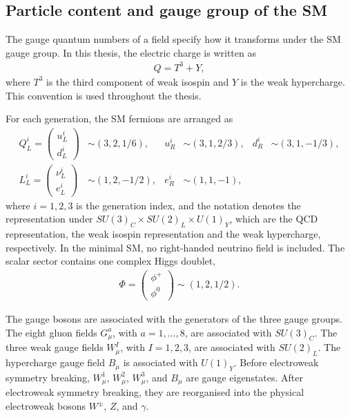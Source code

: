 \subsection{Particle content and gauge group of the SM}
\label{subsec:sm_particle_content}

The gauge quantum numbers of a field specify how it transforms under the SM gauge group. 
In this thesis, the electric charge is written as
\begin{align}
    Q = T^{3} + Y,
    \label{eq:electric_charge_relation}
\end{align}
where $T^{3}$ is the third component of weak isospin and $Y$ is the weak hypercharge. 
This convention is used throughout the thesis.

For each generation, the SM fermions are arranged as
\begin{align}
    Q_{L}^{i}
    =
    \begin{pmatrix}
        u_{L}^{i} \\
        d_{L}^{i}
    \end{pmatrix}
    &\sim
    (3,2,1/6),
    &
    u_{R}^{i}
    &\sim
    (3,1,2/3),
    &
    d_{R}^{i}
    &\sim
    (3,1,-1/3),
    \\
    L_{L}^{i}
    =
    \begin{pmatrix}
        \nu_{L}^{i} \\
        e_{L}^{i}
    \end{pmatrix}
    &\sim
    (1,2,-1/2),
    &
    e_{R}^{i}
    &\sim
    (1,1,-1),
    \label{eq:sm_fermion_representations}
\end{align}
where $i=1,2,3$ is the generation index, and the notation denotes the representation under
$SU(3)_{C}\times SU(2)_{L}\times U(1)_{Y}$, which are the QCD representation, the weak isospin representation and the weak hypercharge, respectively.
In the minimal SM, no right-handed neutrino field is included. 
The scalar sector contains one complex Higgs doublet,
\begin{align}
    \Phi
    =
    \begin{pmatrix}
        \phi^{+} \\
        \phi^{0}
    \end{pmatrix}
    \sim
    (1,2,1/2).
    \label{eq:higgs_doublet_representation}
\end{align}

The gauge bosons are associated with the generators of the three gauge groups. 
The eight gluon fields $G_{\mu}^{a}$, with $a=1,\ldots,8$, are associated with $SU(3)_{C}$. 
The three weak gauge fields $W_{\mu}^{I}$, with $I=1,2,3$, are associated with $SU(2)_{L}$. 
The hypercharge gauge field $B_{\mu}$ is associated with $U(1)_{Y}$. 
Before electroweak symmetry breaking, $W_{\mu}^{1}$, $W_{\mu}^{2}$, $W_{\mu}^{3}$, and $B_{\mu}$ are gauge eigenstates. 
After electroweak symmetry breaking, they are reorganised into the physical electroweak bosons $W^{\pm}$, $Z$, and $\gamma$.

